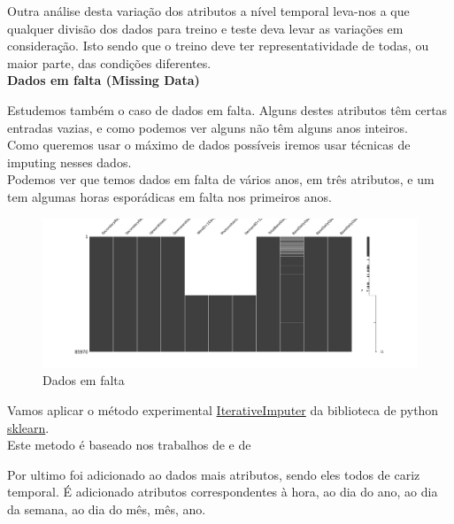 Outra análise desta variação dos atributos a nível temporal leva-nos a que qualquer divisão dos dados para treino e teste deva levar as variações em consideração. Isto sendo que o treino deve ter representatividade de todas, ou maior parte, das condições diferentes. \\


\textbf{Dados em falta (Missing Data)}

Estudemos também o caso de dados em falta. Alguns destes atributos têm certas entradas vazias, e como podemos ver alguns não têm alguns anos inteiros.\\
Como queremos usar o máximo de dados possíveis iremos usar técnicas de imputing nesses dados. \\
Podemos ver que temos dados em falta de vários anos, em três atributos, e um tem algumas horas esporádicas em falta nos primeiros anos.\\

\begin{figure}[H]
  \centering
  \includegraphics[width=\textwidth]{plots/missing_data.png}
  \caption{Dados em falta}
\end{figure}

Vamos aplicar o método experimental \href{https://scikit-learn.org/stable/modules/generated/sklearn.impute.IterativeImputer.html}{IterativeImputer} da biblioteca de python \href{https://scikit-learn.org/stable/index.html}{sklearn}. \\
Este metodo é baseado nos trabalhos de \cite{vanBuuren2011} e de \cite{Buck1960}

Por ultimo foi adicionado ao dados mais atributos, sendo eles todos de cariz temporal. É adicionado atributos correspondentes à hora, ao dia do ano, ao dia da semana, ao dia do mês, mês, ano. \\

